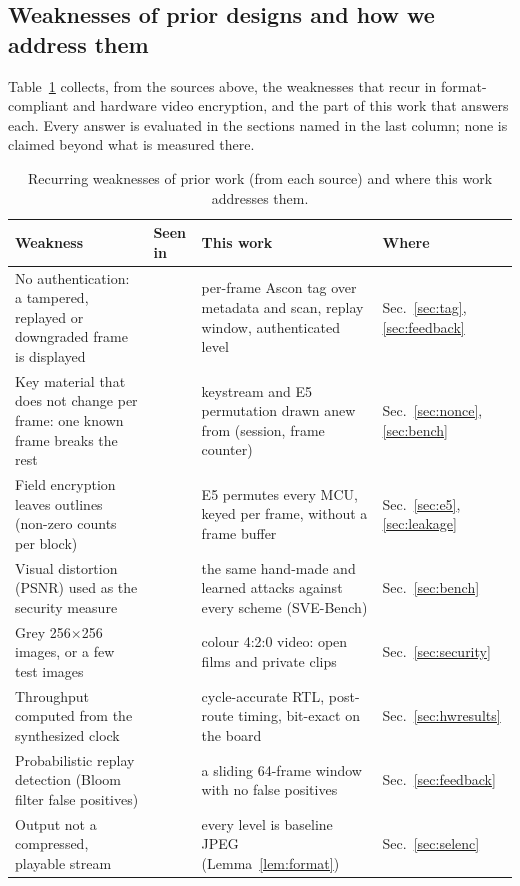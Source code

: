 \subsection{Weaknesses of prior designs and how we address them}\label{sec:weak}
Table~\ref{tab:weak} collects, from the sources above, the weaknesses that recur in format-compliant and hardware video encryption, and the part of this work that answers each. Every answer is evaluated in the sections named in the last column; none is claimed beyond what is measured there.

\begin{table}[t]
\caption{Recurring weaknesses of prior work (from each source) and where this work addresses them.}
\label{tab:weak}
\centering\small\setlength{\tabcolsep}{4pt}
\begin{tabular}{p{}p{}p{}p{}}
\toprule
Weakness & Seen in & This work & Where \\
\midrule
No authentication: a tampered, replayed or downgraded frame is displayed & \cite{kishore2015,bagbaba2015,qiu2025} & per-frame Ascon tag over metadata and scan, replay window, authenticated level & Sec.~\ref{sec:tag}, \ref{sec:feedback} \\
Key material that does not change per frame: one known frame breaks the rest & \cite{vandroogenbroeck2002,kishore2015,hirose2024,li2025shuffle} & keystream and E5 permutation drawn anew from (session, frame counter) & Sec.~\ref{sec:nonce}, \ref{sec:bench} \\
Field encryption leaves outlines (non-zero counts per block) & \cite{hirose2024} & E5 permutes every MCU, keyed per frame, without a frame buffer & Sec.~\ref{sec:e5}, \ref{sec:leakage} \\
Visual distortion (PSNR) used as the security measure & \cite{bagbaba2015,kishore2015,massoudi2008} & the same hand-made and learned attacks against every scheme (SVE-Bench) & Sec.~\ref{sec:bench} \\
Grey 256$\times$256 images, or a few test images & \cite{kishore2015} & colour 4:2:0 video: open films and private clips & Sec.~\ref{sec:security} \\
Throughput computed from the synthesized clock & \cite{kishore2015,khairallah2023} & cycle-accurate RTL, post-route timing, bit-exact on the board & Sec.~\ref{sec:hwresults} \\
Probabilistic replay detection (Bloom filter false positives) & \cite{kurian2025} & a sliding 64-frame window with no false positives & Sec.~\ref{sec:feedback} \\
Output not a compressed, playable stream & \cite{qiu2025} & every level is baseline JPEG (Lemma~\ref{lem:format}) & Sec.~\ref{sec:selenc} \\
\bottomrule
\end{tabular}
\end{table}

